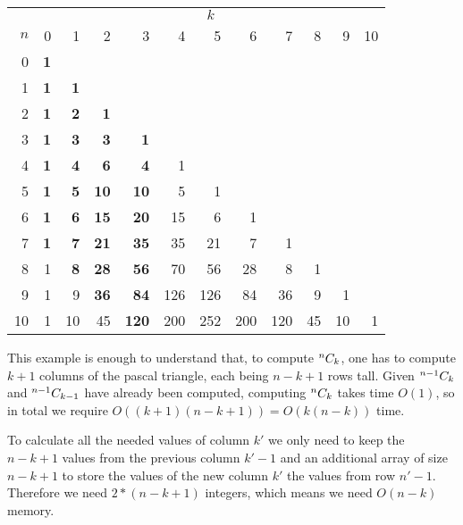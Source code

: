 \documentclass{cal}
\begin{document}
{\begin{center} \begin{tabular}{r | r r r r r r r r r r r}
        & \multicolumn{11}{c}{$k$} \\
    $n$ &         0  &          1  &          2  &           3  &   4 &   5 &   6 &   7 &   8 &   9 &   10 \\ \hline
      0 & \textbf{1} &             &             &              &     &     &     &     &     &     &      \\
      1 & \textbf{1} &  \textbf{1} &             &              &     &     &     &     &     &     &      \\
      2 & \textbf{1} &  \textbf{2} & \textbf{ 1} &              &     &     &     &     &     &     &      \\
      3 & \textbf{1} &  \textbf{3} & \textbf{ 3} & \textbf{  1} &     &     &     &     &     &     &      \\
      4 & \textbf{1} &  \textbf{4} & \textbf{ 6} & \textbf{  4} &   1 &     &     &     &     &     &      \\
      5 & \textbf{1} &  \textbf{5} & \textbf{10} & \textbf{ 10} &   5 &   1 &     &     &     &     &      \\
      6 & \textbf{1} &  \textbf{6} & \textbf{15} & \textbf{ 20} &  15 &   6 &   1 &     &     &     &      \\
      7 & \textbf{1} &  \textbf{7} & \textbf{21} & \textbf{ 35} &  35 &  21 &   7 &   1 &     &     &      \\
      8 &         1  &  \textbf{8} & \textbf{28} & \textbf{ 56} &  70 &  56 &  28 &   8 &   1 &     &      \\
      9 &         1  &          9  & \textbf{36} & \textbf{ 84} & 126 & 126 &  84 &  36 &   9 &   1 &      \\
     10 &         1  &         10  &         45  & \textbf{120} & 200 & 252 & 200 & 120 &  45 &  10 &   1  \\
\end{tabular} \end{center}

This example is enough to understand that, to compute $^{n}C_{k}$, one has to compute $k+1$ columns of the pascal triangle, each being $n-k+1$ rows tall. Given $^{n-1}C_{k}$ and $^{n-1}C_{k-1}$ have already been computed, computing $^{n}C_{k}$ takes time $O(1)$, so in total we require $O((k+1)(n-k+1)) = O(k(n-k))$ time.

To calculate all the needed values of column $k'$ we only need to keep the $n-k+1$ values from the previous column $k'-1$ and an additional array of size $n-k+1$ to store the values of the new column $k'$ the values from row $n'-1$. Therefore we need $2*(n-k+1)$ integers, which means we need $O(n-k)$ memory.

}
\end{document}

